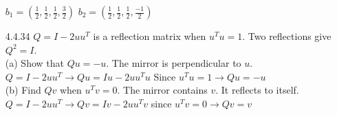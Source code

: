 \documentclass[10pt,twoside,reqno]{article}
\begin{document}
\begin{enumerate}
\vspace{3mm}
$b_1 = (\frac{1}{2}, \frac{1}{2}, \frac{1}{2}, \frac{3}{2})$ \hspace{3mm} $b_2 = (\frac{1}{2}, \frac{1}{2}, \frac{1}{2}, \frac{-1}{2})$\\
\item[4.4.34] $Q = I - 2uu^T$ is a reflection matrix when $u^Tu = 1$. Two reflections give $Q^2 = I$.\\
(a) Show that $Qu = -u$. The mirror is perpendicular to $u$.\\
\vspace{3mm}
$Q = I - 2uu^T \rightarrow Qu = Iu - 2uu^Tu$ Since $u^Tu = 1 \rightarrow Qu = -u$\\
\vspace{3mm}
(b) Find $Qv$ when $u^Tv = 0$. The mirror contains $v$. It reflects to itself.\\
\vspace{3mm}
$Q = I - 2uu^T \rightarrow Qv = Iv - 2uu^Tv$ since $u^Tv = 0 \rightarrow Qv = v$
\vspace{3mm}
\end{enumerate}
\end{document}
